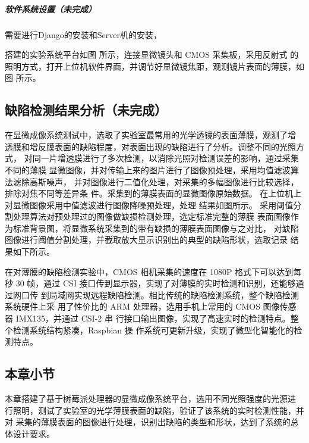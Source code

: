 \subparagraph{软件系统设置（未完成）}
需要进行Django的安装和Server机的安装，


搭建的实验系统平台如图 所示，连接显微镜头和 CMOS 采集板，采用反射式 的照明方式，打开上位机软件界面，并调节好显微镜焦距，观测镜片表面的薄膜，如 图 所示。

\subsection{缺陷检测结果分析（未完成）}
在显微成像系统测试中，选取了实验室最常用的光学透镜的表面薄膜，观测了增 透膜和增反膜表面的缺陷程度，对表面出现的缺陷进行了分析。调整不同的光照方式， 对同一片增透膜进行了多次检测，以消除光照对检测误差的影响，通过采集不同的薄膜 显微图像，并对传输上来的图片进行了图像预处理，采用均值滤波算法滤除高斯噪声， 并对图像进行二值化处理，对采集的多幅图像进行比较选择，排除对焦不同等差异条 件。采集到的薄膜表面的显微图像原始数据。
在上位机上对显微图像采用中值滤波进行图像降噪预处理，处理 结果如图所示。
采用阈值分割处理算法对预处理过的图像做缺损检测处理，选定标准完整的薄膜 表面图像作为标准背景图，将显微系统采集到的带有缺损的薄膜表面图像与之对比， 对缺陷图像进行阈值分割处理，并截取放大显示识别出的典型的缺陷形状，选取记录 结果如下所示。

在对薄膜的缺陷检测实验中，CMOS 相机采集的速度在 1080P 格式下可以达到每秒 30 帧，通过 CSI 接口传到显示器，实现了对薄膜的实时检测和识别，还能够通过网口传 到局域网实现远程缺陷检测。相比传统的缺陷检测系统，整个缺陷检测系统硬件上采 用了性价比的 ARM 处理器，选用手机上常用的 CMOS 图像传感器 IMX135，并通过 CSI-2 串 行接口输出图像，实现了高速实时的检测特点。整个检测系统结构紧凑，Raspbian 操 作系统可更新升级，实现了微型化智能化的检测特点。
\subsection{本章小节}
本章搭建了基于树莓派处理器的显微成像系统平台，选用不同光照强度的光源进 行照明，测试了实验室的光学薄膜表面的缺陷，验证了该系统的实时检测性能，并对 采集的薄膜表面的图像进行处理，识别出缺陷的类型和形状，达到了系统的总体设计要求。

